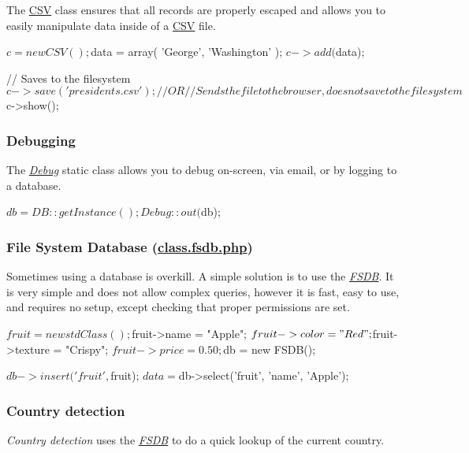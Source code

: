 The \hyperlink{class_c_s_v}{C\-S\-V} class ensures that all records are properly escaped and allows you to easily manipulate data inside of a \hyperlink{class_c_s_v}{C\-S\-V} file. \begin{DoxyVerb}$c = new CSV();
$data = array(
    'George',
    'Washington'
);
$c->add($data);

// Saves to the filesystem
$c->save('presidents.csv');

// OR

// Sends the file to the browser, does not save to the filesystem
$c->show();
\end{DoxyVerb}


\subsubsection*{Debugging}

The {\itshape \hyperlink{class_debug}{Debug}} static class allows you to debug on-\/screen, via email, or by logging to a database. \begin{DoxyVerb}$db = DB::getInstance();
Debug::out($db);
\end{DoxyVerb}


\subsubsection*{File System Database (\hyperlink{class_8fsdb_8php}{class.\-fsdb.\-php})}

Sometimes using a database is overkill. A simple solution is to use the {\itshape \hyperlink{class_f_s_d_b}{F\-S\-D\-B}}. It is very simple and does not allow complex queries, however it is fast, easy to use, and requires no setup, except checking that proper permissions are set. \begin{DoxyVerb}$fruit = new stdClass();

$fruit->name = "Apple";
$fruit->color = "Red";
$fruit->texture = "Crispy";
$fruit->price = 0.50;

$db = new FSDB();

$db->insert('fruit', $fruit);
$data = $db->select('fruit', 'name', 'Apple');
\end{DoxyVerb}


\subsubsection*{Country detection}

{\itshape Country detection} uses the {\itshape \hyperlink{class_f_s_d_b}{F\-S\-D\-B}} to do a quick lookup of the current country. 


